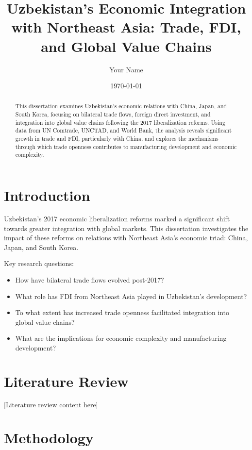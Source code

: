 \documentclass[12pt,a4paper]{article}
\title{Uzbekistan's Economic Integration with Northeast Asia: Trade, FDI, and Global Value Chains}
\author{Your Name}
\date{\today}
\begin{document}
\maketitle

\begin{abstract}
This dissertation examines Uzbekistan's economic relations with China, Japan, and South Korea, focusing on bilateral trade flows, foreign direct investment, and integration into global value chains following the 2017 liberalization reforms. Using data from UN Comtrade, UNCTAD, and World Bank, the analysis reveals significant growth in trade and FDI, particularly with China, and explores the mechanisms through which trade openness contributes to manufacturing development and economic complexity.
\end{abstract}

\tableofcontents
\newpage

\section{Introduction}
\label{sec:intro}

Uzbekistan's 2017 economic liberalization reforms marked a significant shift towards greater integration with global markets. This dissertation investigates the impact of these reforms on relations with Northeast Asia's economic triad: China, Japan, and South Korea.

Key research questions:
\begin{itemize}
\item How have bilateral trade flows evolved post-2017?
\item What role has FDI from Northeast Asia played in Uzbekistan's development?
\item To what extent has increased trade openness facilitated integration into global value chains?
\item What are the implications for economic complexity and manufacturing development?
\end{itemize}

\section{Literature Review}
\label{sec:lit}

[Literature review content here]

\section{Methodology}
\label{sec:method}
\end{document}
